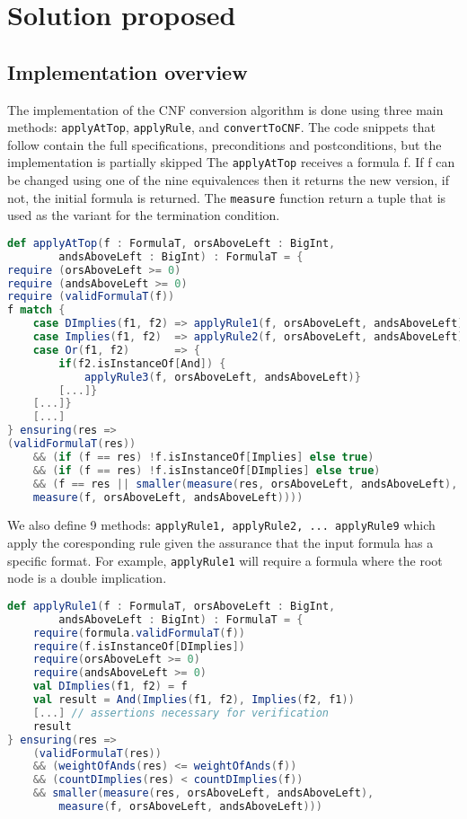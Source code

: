 \chapter{Solution proposed}

\section{Implementation overview}

The implementation of the CNF conversion algorithm is done using three main methods:
\texttt{applyAtTop}, \texttt{applyRule}, and \texttt{convertToCNF}. The code snippets 
that follow contain the full specifications, preconditions and postconditions, but the
implementation is partially skipped 
The \texttt{applyAtTop} receives a formula f. If f can be changed using one of
the nine equivalences then it returns the new version, if not, the initial formula
is returned. The \texttt{measure} function return a tuple that is used as the variant
for the termination condition.

\begin{lstlisting}[language=Scala, caption={Method \texttt{applyAtTop}}]
def applyAtTop(f : FormulaT, orsAboveLeft : BigInt, 
        andsAboveLeft : BigInt) : FormulaT = {
require (orsAboveLeft >= 0)
require (andsAboveLeft >= 0)
require (validFormulaT(f))
f match {
    case DImplies(f1, f2) => applyRule1(f, orsAboveLeft, andsAboveLeft)
    case Implies(f1, f2)  => applyRule2(f, orsAboveLeft, andsAboveLeft)
    case Or(f1, f2)       => {        
        if(f2.isInstanceOf[And]) {
            applyRule3(f, orsAboveLeft, andsAboveLeft)}
        [...]}
    [...]}
    [...]
} ensuring(res =>
(validFormulaT(res))
    && (if (f == res) !f.isInstanceOf[Implies] else true)
    && (if (f == res) !f.isInstanceOf[DImplies] else true)
    && (f == res || smaller(measure(res, orsAboveLeft, andsAboveLeft),
    measure(f, orsAboveLeft, andsAboveLeft))))
\end{lstlisting}


We also define 9 methods: \texttt{applyRule1, applyRule2, ... applyRule9} 
which apply the coresponding rule given the assurance that the input formula
has a specific format. For example, \texttt{applyRule1} will require a formula
where the root node is a double implication.

\begin{lstlisting}[language=Scala, caption={Method \texttt{applyRule1}}]
def applyRule1(f : FormulaT, orsAboveLeft : BigInt, 
        andsAboveLeft : BigInt) : FormulaT = {
    require(formula.validFormulaT(f))
    require(f.isInstanceOf[DImplies])
    require(orsAboveLeft >= 0)
    require(andsAboveLeft >= 0)
    val DImplies(f1, f2) = f
    val result = And(Implies(f1, f2), Implies(f2, f1))
    [...] // assertions necessary for verification
    result
} ensuring(res =>
    (validFormulaT(res))
    && (weightOfAnds(res) <= weightOfAnds(f))
    && (countDImplies(res) < countDImplies(f))
    && smaller(measure(res, orsAboveLeft, andsAboveLeft),
        measure(f, orsAboveLeft, andsAboveLeft)))           
\end{lstlisting}

